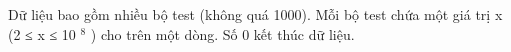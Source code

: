 Dữ liệu bao gồm nhiều bộ test (không quá 1000). Mỗi bộ test chứa một giá trị x (2 ≤ x ≤ 10   $^    8   $   ) cho trên một dòng. Số 0 kết thúc dữ liệu.